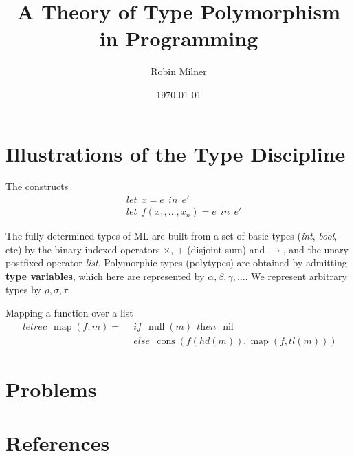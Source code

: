 \documentclass[11pt]{article}
\author{Robin Milner}
\date{\today}
\title{A Theory of Type Polymorphism in Programming}
\DeclareMathOperator{\llet}{\textit{let}\,}
\DeclareMathOperator{\lletrec}{\textit{letrec}\,}
\DeclareMathOperator{\iin}{\,\textit{in}\,}
\DeclareMathOperator{\iif}{\,\textit{if}\,}
\DeclareMathOperator{\eelse}{\,\textit{else}\,}
\DeclareMathOperator{\tthen}{\,\textit{then}\,}
\DeclareMathOperator{\mmap}{map}
\DeclareMathOperator{\nnull}{null}
\DeclareMathOperator{\nnil}{nil}
\DeclareMathOperator{\ccons}{cons}
\begin{document}
\maketitle
\section{Illustrations of the Type Discipline}
\label{sec:org8df5cdd}
The constructs
\begin{align*}
&\llet x=e\iin e'\\
&\llet f(x_1,\dots,x_n)=e\iin e'
\end{align*}

The fully determined types of ML are built from a set of basic types (\emph{int}, \emph{bool}, etc) by the binary
indexed operators \(\times\), \(+\) (disjoint sum) and \(\to\), and the unary postfixed operator \emph{list}.
Polymorphic types (polytypes) are obtained by admitting \textbf{type variables}, which here are represented by
\(\alpha,\beta,\gamma,\dots\). We represent arbitrary types by \(\rho,\sigma,\tau\).

\begin{examplle}[]
Mapping a function over a list
\begin{align*}
\lletrec\mmap(f,m)=&\iif\nnull(m)\tthen\nnil\\
&\eelse\ccons(f(hd(m)),\mmap(f,tl(m)))
\end{align*}
\end{examplle}
\section{Problems}
\label{sec:orga6065e9}


\section{References}
\label{sec:org3a73025}
\label{bibliographystyle link}



\end{document}
